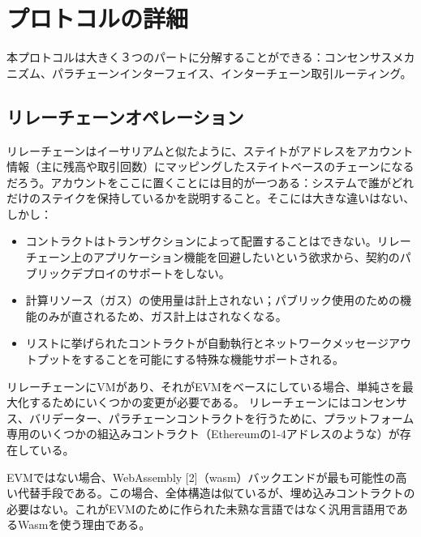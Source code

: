 \hypertarget{ux30d7ux30edux30c8ux30b3ux30ebux306eux8a73ux7d30}{%
\section{プロトコルの詳細}\label{ux30d7ux30edux30c8ux30b3ux30ebux306eux8a73ux7d30}}

本プロトコルは大きく３つのパートに分解することができる：コンセンサスメカニズム、パラチェーンインターフェイス、インターチェーン取引ルーティング。

\hypertarget{ux30eaux30ecux30fcux30c1ux30a7ux30fcux30f3ux30aaux30daux30ecux30fcux30b7ux30e7ux30f3}{%
\subsection{リレーチェーンオペレーション}\label{ux30eaux30ecux30fcux30c1ux30a7ux30fcux30f3ux30aaux30daux30ecux30fcux30b7ux30e7ux30f3}}

リレーチェーンはイーサリアムと似たように、ステイトがアドレスをアカウント情報（主に残高や取引回数）にマッピングしたステイトベースのチェーンになるだろう。アカウントをここに置くことには目的が一つある：システムで誰がどれだけのステイクを保持しているかを説明すること。そこには大きな違いはない、しかし：

\begin{itemize}
\tightlist
\item
  コントラクトはトランザクションによって配置することはできない。リレーチェーン上のアプリケーション機能を回避したいという欲求から、契約のパブリックデプロイのサポートをしない。
\item
  計算リソース（ガス）の使用量は計上されない；パブリック使用のための機能のみが直されるため、ガス計上はされなくなる。
\item
  リストに挙げられたコントラクトが自動執行とネットワークメッセージアウトプットをすることを可能にする特殊な機能サポートされる。
\end{itemize}

リレーチェーンにVMがあり、それがEVMをベースにしている場合、単純さを最大化するためにいくつかの変更が必要である。
リレーチェーンにはコンセンサス、バリデーター、パラチェーンコントラクトを行うために、プラットフォーム専用のいくつかの組込みコントラクト（Ethereumの1-4アドレスのような）が存在している。

EVMではない場合、WebAssembly
{[}2{]}（wasm）バックエンドが最も可能性の高い代替手段である。この場合、全体構造は似ているが、埋め込みコントラクトの必要はない。これがEVMのために作られた未熟な言語ではなく汎用言語用であるWasmを使う理由である。

